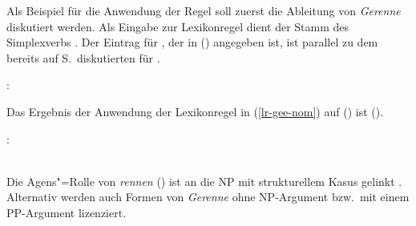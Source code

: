 Als Beispiel für die Anwendung der Regel soll zuerst die Ableitung von \emph{Gerenne} diskutiert
werden. Als Eingabe zur Lexikonregel dient der Stamm des Simplexverbs .
Der Eintrag für , der in () angegeben ist, ist parallel
zu dem bereits auf S.\,\pageref{le-lachen} diskutierten für .

\eas
{}:\\
\zs

\noindent
Das Ergebnis der Anwendung der Lexikonregel in (\ref{lr-gee-nom}) auf ()
ist ().

\eas
\label{le-gerenne}%
:\\
\\
\zs

\noindent
Die Agens"=Rolle von \emph{rennen} (\argone) ist an die NP mit strukturellem Kasus gelinkt
. Alternativ werden auch Formen von \emph{Gerenne} ohne NP-Argument bzw.\ mit einem PP-Argument lizenziert.

